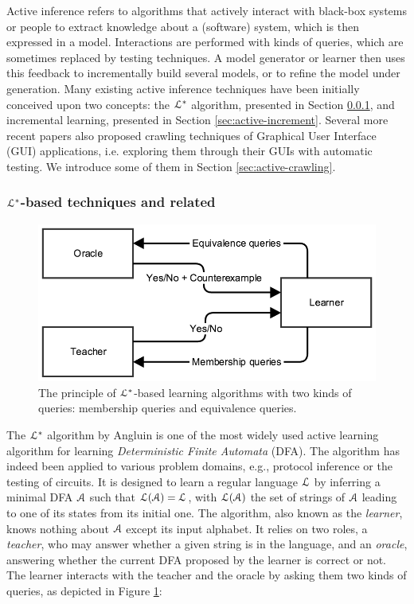 Active inference refers to algorithms that actively interact with
black-box systems or people to extract knowledge about a
(software) system, which is then expressed in a model.
Interactions are performed with kinds of queries, which are
sometimes replaced by testing techniques. A model generator or
learner then uses this feedback to incrementally build several
models, or to refine the model under generation. Many existing
active inference techniques have been initially conceived upon
two concepts: the $\EuScript{L}^*$ algorithm, presented in
Section \ref{sec:active-letoile}, and incremental learning,
presented in Section \ref{sec:active-increment}. Several more
recent papers also proposed crawling techniques of Graphical User
Interface (GUI) applications, i.e. exploring them through their
GUIs with automatic testing. We introduce some of them in Section
\ref{sec:active-crawling}.

\subsubsection{$\EuScript{L}^*$-based techniques and related}
\label{sec:active-letoile}

\begin{figure}[h]
    \begin{center}
        \includegraphics[width=0.9\linewidth]{figures/angluin.png}
    \end{center}

    \caption{The principle of $\EuScript{L}^*$-based learning
    algorithms with two kinds of queries: membership queries and
    equivalence queries.}
    \label{fig:angluin}
\end{figure}

The $\EuScript{L}^*$ algorithm by Angluin \cite{Angluin198787} is
one of the most widely used active learning algorithm for
learning \textit{Deterministic Finite Automata} (DFA). The
algorithm has indeed been applied to various problem domains,
e.g., protocol inference or the testing of circuits. It is
designed to learn a regular language $\EuScript{L}$ by inferring
a minimal DFA $\EuScript{A}$ such that
$\EuScript{L}(\EuScript{A})=\EuScript{L}$, with
$\EuScript{L}(\EuScript{A})$ the set of strings of $\EuScript{A}$
leading to one of its states from its initial one. The algorithm,
also known as the \textit{learner}, knows nothing about
$\EuScript{A}$ except its input alphabet. It relies on two roles,
a \textit{teacher}, who may answer whether a given string is in
the language, and an \textit{oracle}, answering whether the
current DFA proposed by the learner is correct or not. The
learner interacts with the teacher and the oracle by asking them
two kinds of queries, as depicted in Figure \ref{fig:angluin}:

